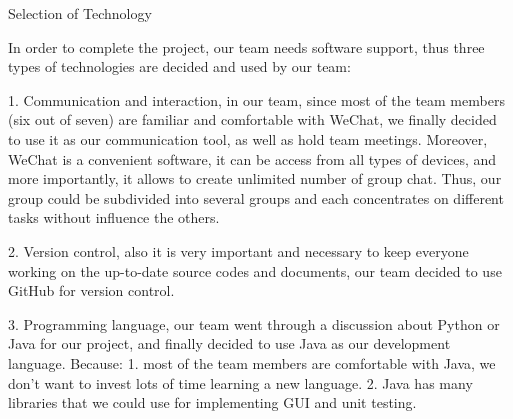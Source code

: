 \documentclass[12pt]{article}
\begin{document}
{\huge Selection of Technology}

In order to complete the project, our team needs software support, thus three types of technologies are decided and used by our team:

1. Communication and interaction, in our team, since most of the team members (six out of seven) are familiar and comfortable with WeChat, we finally decided to use it as our communication tool, as well as hold team meetings. Moreover, WeChat is a convenient software, it can be access from all types of devices, and more importantly, it allows to create unlimited number of group chat. Thus, our group could be subdivided into several groups and each concentrates on different tasks without influence the others.

2. Version control, also it is very important and necessary to keep everyone working on the up-to-date source codes and documents, our team decided to use GitHub for version control.

3. Programming language, our team went through a discussion about  Python or Java for our project, and finally decided to use Java as our development language. Because: 1. most of the team members are comfortable with Java, we don't want to invest lots of time learning a new language. 2. Java has many libraries that we could use for implementing GUI and unit testing.
\end{document}
